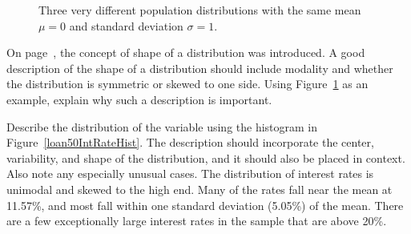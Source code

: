 
\begin{figure}
  \centering
  \caption{Three very different population distributions
      with the same mean $\mu=0$ and standard deviation
      $\sigma=1$.}
  \label{severalDiffDistWithSdOf1}
\end{figure}

\begin{exercisewrap}
\begin{nexercise}
On page~\pageref{shapeFirstDiscussed}, the concept of
shape of a distribution was introduced.
A good description of the shape of a distribution should
include modality and whether the distribution is symmetric
or skewed to one side.
Using Figure~\ref{severalDiffDistWithSdOf1} as an example,
explain why such a description is
important.\footnotemark{}
\end{nexercise}
\end{exercisewrap}

\begin{examplewrap}
\begin{nexample}{Describe the distribution of the
     variable using
    the histogram in Figure~\ref{loan50IntRateHist}.
    The description should incorporate the center,
    variability, and shape of the distribution,
    and it should also be placed in context.
    Also note any especially unusual cases.}
  The distribution of interest rates is unimodal
  and skewed to the high end.
  Many of the rates fall near the mean at 11.57\%,
  and most fall within one standard deviation (5.05\%)
  of the mean.
  There are a few exceptionally large interest rates
  in the sample that are above 20\%.
\end{nexample}
\end{examplewrap}

